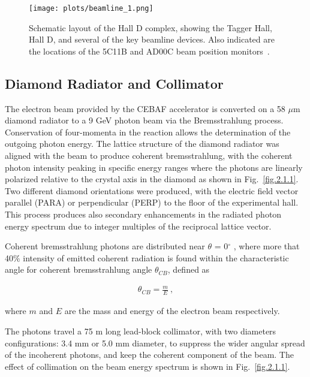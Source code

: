 \begin{figure}[H]
    \centering
        \texttt{[image: plots/beamline\_1.png]}
        \caption{Schematic layout of the Hall D complex, showing the Tagger Hall, Hall D, and several of the key beamline devices. Also indicated are the locations of the 5C11B and AD00C beam position monitors~\cite{30}.}
        \label{fig.2.1}
\end{figure}

\subsection{Diamond Radiator and Collimator}
\label{p.2.1.1}

The electron beam provided by the CEBAF accelerator is converted on a 58 $\mu$m diamond radiator to a 9 GeV photon beam via the Bremsstrahlung process. Conservation of four-momenta in the reaction allows the determination of the outgoing photon energy. The lattice structure of the diamond radiator was aligned with the beam to produce coherent bremsstrahlung, with the coherent photon intensity peaking in specific energy ranges where the photons are linearly polarized relative to the crystal axis in the diamond as shown in Fig.~\ref{fig.2.1.1}. Two different diamond orientations were produced, with the electric field vector parallel (PARA) or perpendicular (PERP) to the floor of the experimental hall. This process produces also secondary enhancements in the radiated photon energy spectrum due to integer multiples of the reciprocal lattice vector.
~\par Coherent bremsstrahlung photons are distributed near $\theta$ = 0$^{\circ}$ , where more that 40$\%$ intensity of emitted coherent radiation is found within the characteristic angle for coherent bremsstrahlung angle $\theta_{CB}$, defined as

\begin{equation}
    \label{eq.2.1.1}
    \begin{aligned}
        \theta_{CB} = \frac{m}{E}~,
    \end{aligned}
\end{equation}

\noindent where $m$ and $E$ are the mass and energy of the electron beam respectively.
~\par The photons travel a 75 m long lead-block collimator, with two diameters configurations: 3.4 mm or 5.0 mm diameter, to suppress the wider angular spread of the incoherent photons, and keep the coherent component of the beam. The effect of collimation on the beam energy spectrum is shown in Fig.~\ref{fig.2.1.1}.

